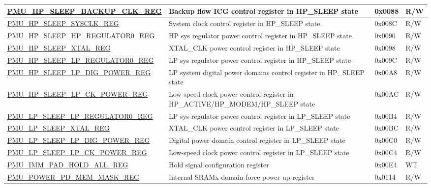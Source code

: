 \begin{longtable}{ | l | L{6cm} | l | l | }
\hyperref[regdesc:PMUHPSLEEPBACKUPCLKREG]{PMU\_HP\_SLEEP\_BACKUP\_CLK\_REG} & Backup flow ICG control register in HP\_SLEEP state & 0x0088 & R/W \\ \hline
\hyperref[regdesc:PMUHPSLEEPSYSCLKREG]{PMU\_HP\_SLEEP\_SYSCLK\_REG} & System clock control register in HP\_SLEEP state & 0x008C & R/W \\ \hline
\hyperref[regdesc:PMUHPSLEEPHPREGULATOR0REG]{PMU\_HP\_SLEEP\_HP\_REGULATOR0\_REG} & HP sys regulator power control register in HP\_SLEEP state & 0x0090 & R/W \\ \hline
\hyperref[regdesc:PMUHPSLEEPXTALREG]{PMU\_HP\_SLEEP\_XTAL\_REG} & XTAL\_CLK power control register in HP\_SLEEP state & 0x0098 & R/W \\ \hline
\hyperref[regdesc:PMUHPSLEEPLPREGULATOR0REG]{PMU\_HP\_SLEEP\_LP\_REGULATOR0\_REG} & LP sys regulator power control register in HP\_SLEEP state & 0x009C & R/W \\ \hline
\hyperref[regdesc:PMUHPSLEEPLPDIGPOWERREG]{PMU\_HP\_SLEEP\_LP\_DIG\_POWER\_REG} & LP system digital power domains control register in HP\_SLEEP state & 0x00A8 & R/W \\ \hline
\hyperref[regdesc:PMUHPSLEEPLPCKPOWERREG]{PMU\_HP\_SLEEP\_LP\_CK\_POWER\_REG} & Low-speed clock power control register in HP\_ACTIVE/HP\_MODEM/HP\_SLEEP state & 0x00AC & R/W \\ \hline
\hyperref[regdesc:PMULPSLEEPLPREGULATOR0REG]{PMU\_LP\_SLEEP\_LP\_REGULATOR0\_REG} & LP sys regulator power control register in LP\_SLEEP state & 0x00B4 & R/W \\ \hline
\hyperref[regdesc:PMULPSLEEPXTALREG]{PMU\_LP\_SLEEP\_XTAL\_REG} & XTAL\_CLK power control register in LP\_SLEEP state & 0x00BC & R/W \\ \hline
\hyperref[regdesc:PMULPSLEEPLPDIGPOWERREG]{PMU\_LP\_SLEEP\_LP\_DIG\_POWER\_REG} & Digital power domain control register in LP\_SLEEP state & 0x00C0 & R/W \\ \hline
\hyperref[regdesc:PMULPSLEEPLPCKPOWERREG]{PMU\_LP\_SLEEP\_LP\_CK\_POWER\_REG} & Low-speed clock power control register in LP\_SLEEP state & 0x00C4 & R/W \\ \hline
\hyperref[regdesc:PMUIMMPADHOLDALLREG]{PMU\_IMM\_PAD\_HOLD\_ALL\_REG} & Hold signal configuration register & 0x00E4 & WT \\ \hline
\hyperref[regdesc:PMUPOWERPDMEMMASKREG]{PMU\_POWER\_PD\_MEM\_MASK\_REG} & Internal SRAMx domain force power up register & 0x0114 & R/W \\ \hline


\end{longtable}
